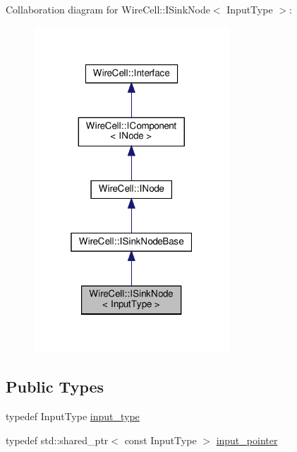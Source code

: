 Collaboration diagram for Wire\+Cell\+:\+:I\+Sink\+Node$<$ Input\+Type $>$\+:
\nopagebreak
\begin{figure}[H]
\begin{center}
\leavevmode
\includegraphics[width=208pt]{class_wire_cell_1_1_i_sink_node__coll__graph}
\end{center}
\end{figure}
\subsection*{Public Types}
\begin{DoxyCompactItemize}
\item 
typedef Input\+Type \hyperlink{class_wire_cell_1_1_i_sink_node_ade16aea6fe9b56ab637b22db5eb15721}{input\+\_\+type}
\item 
typedef std\+::shared\+\_\+ptr$<$ const Input\+Type $>$ \hyperlink{class_wire_cell_1_1_i_sink_node_abec1b6fe3da78c63bbc88c4f3f805d91}{input\+\_\+pointer}
\end{DoxyCompactItemize}
